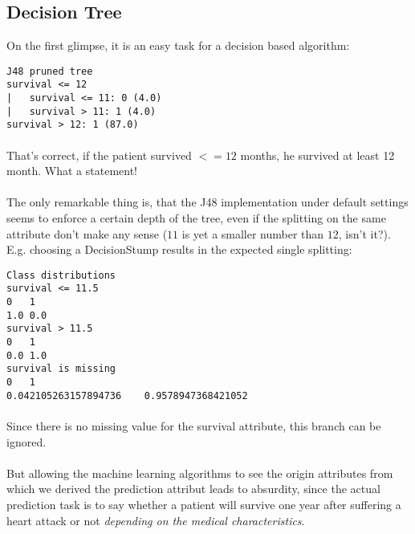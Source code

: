 \documentclass[paper=a4, fontsize=11pt]{scrartcl} %
\numberwithin{equation}{section} %
\numberwithin{figure}{section} %
\numberwithin{table}{section} %
\begin{document}


\subsection{Decision Tree}
On the first glimpse, it is an easy task for a decision based algorithm:

\begin{lstlisting}
J48 pruned tree
survival <= 12
|   survival <= 11: 0 (4.0)
|   survival > 11: 1 (4.0)
survival > 12: 1 (87.0)
\end{lstlisting}

\paragraph{}That's correct, if the patient survived $ <= 12 $ months, he survived at least 12 month. What a statement! 

\paragraph{}The only remarkable thing is, that the J48 implementation under default settings seems to enforce a certain depth of the tree, even if the splitting on the same attribute don't make any sense ($ 11 $ is yet a smaller number than $ 12 $, isn't it?). E.g. choosing a DecisionStump results in the expected single splitting: 
\begin{lstlisting}
Class distributions
survival <= 11.5
0   1   
1.0 0.0 
survival > 11.5
0   1   
0.0 1.0 
survival is missing
0   1   
0.042105263157894736    0.9578947368421052
\end{lstlisting}
\paragraph{}Since there is no missing value for the survival attribute, this branch can be ignored.

\paragraph{}But allowing the machine learning algorithms to see the origin attributes from which we derived the prediction attribut leads to absurdity, since the actual prediction task is to say whether a patient will survive one year after suffering a heart attack or not \emph{depending on the medical characteristics}.
\end{document}
